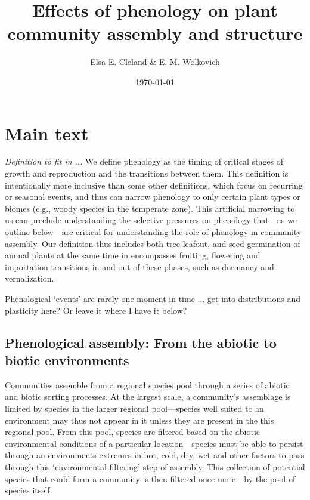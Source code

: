 \documentclass[11pt]{article}
\begin{document}

\renewcommand{\refname}{\CHead{}}

\title{Effects of phenology on plant community assembly and structure }
\author{Elsa E. Cleland \& E. M. Wolkovich}
\date{\today}
\maketitle
\tableofcontents

\setlength{\parindent}{0cm}
\setlength{\parskip}{5pt}


\section{Main text}


\emph{Definition to fit in ...} 
We define phenology as the timing of critical stages of growth and reproduction and the transitions between them. This definition is intentionally more inclusive than some other definitions, which focus on recurring or seasonal events, and thus can narrow phenology to only certain plant types or biomes (e.g., woody species in the temperate zone). This artificial narrowing to us can preclude understanding the selective pressures on phenology that---as we outline below---are critical for understanding the role of phenology in community assembly. Our definition thus includes both tree leafout, and seed germination of annual plants at the same time in encompasses fruiting, flowering and importation transitions in and out of these phases, such as dormancy and vernalization.

Phenological `events' are rarely one moment in time ... get into distributions and plasticity here? Or leave it where I have it below?

\subsection*{Phenological assembly: From the abiotic to biotic environments}
Communities assemble from a regional species pool through a series of abiotic and biotic sorting processes. At the largest scale, a community's assemblage is limited by species in the larger regional pool---species well suited to an environment may thus not appear in it unless they are present in the this regional pool. From this pool, species are filtered based on the abiotic environmental conditions of a particular location---species must be able to persist through an environments extremes in hot, cold, dry, wet and other factors to pass through this `environmental filtering' step of assembly. This collection of potential species that could form a community is then filtered once more---by the pool of species itself. 
\end{document}
